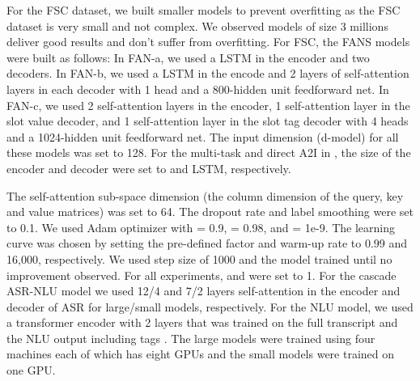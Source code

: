 \documentclass[a4paper]{article}
\begin{document}
For the FSC dataset, we built smaller models to prevent overfitting as the FSC dataset is very small and not complex. We observed models of size  3 millions deliver good results and don't suffer from overfitting. For FSC, the FANS models were built as follows:  In FAN-a, we used a   LSTM in the encoder and two decoders.   In FAN-b, we used  a    LSTM in the encode and 2 layers of self-attention layers in each decoder with  1 head and a 800-hidden unit feedforward net.  In FAN-c, we used 2 self-attention layers in the encoder, 1 self-attention layer in the slot value decoder, and 1 self-attention layer in the slot tag decoder with  4 heads and a 1024-hidden unit feedforward net.   The input dimension (d-model) for all these models was set to 128. For the multi-task and direct A2I  in \cite{haghani2018audio},  the size of the encoder and decoder were set  to    and  LSTM, respectively.

The self-attention sub-space dimension (the column dimension of the query, key and value matrices) was set to 64.  The dropout rate and label smoothing were set to 0.1.  We used  Adam optimizer with  = 0.9, = 0.98, and  = 1e-9.  The learning curve was chosen by setting the pre-defined factor  and warm-up rate  to 0.99 and 16,000, respectively. We used step size of 1000 and the model trained until no improvement observed.  For all experiments,   and  were set to 1. For the cascade ASR-NLU model we used 12/4  and 7/2 layers self-attention in the encoder and decoder of ASR for large/small models, respectively. For the NLU model, we used a transformer encoder with 2 layers that was trained on the full transcript and the NLU output including  tags . The large models were trained using four machines each of which has eight GPUs and the small models were trained on one GPU.
\end{document}
